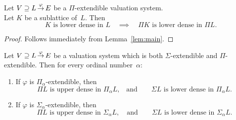 \documentclass[main.tex]{subfiles}
\begin{document}
\begin{cor}
\label{C:main-nice}
Let $V \supseteq L\,\smash{\stackrel{\varphi}{\rightarrow}}\,E$ be a $\Pi$-extendible valuation system.\\
Let $K$ be a sublattice of~$L$. Then
\begin{equation*}
\text{ $K$ is lower dense in~$L$}
\quad\implies\quad
\text{$\Pi K$ is lower dense in~$\Pi L$.}
\end{equation*}
\end{cor}
\begin{proof}
Follows immediately from Lemma~\ref{lem:main}.
\end{proof}
%
%
\begin{lem}
\label{L:fitting-dense}
Let $V \supseteq L\,\smash{\stackrel{\varphi}{\rightarrow}}\,E$ be a valuation system
which is both $\Sigma$-extendible
and $\Pi$-extendible.
Then for every ordinal number~$\alpha$:
\begin{enumerate}
\item 
\label{L:fitting-dense-1}
If $\varphi$ is $\Pi_\alpha$-extendible,
then 
\begin{equation*}
\text{$\Pi L$ is upper dense in $\Pi_\alpha L$,}
\quad\text{and}\qquad
\text{$\Sigma L$ is lower dense in $\Pi_\alpha L$.}
\end{equation*}

\item
\label{L:fitting-dense-2}
If $\varphi$ is $\Sigma_\alpha$-extendible,
then 
\begin{equation*}
\text{$\Pi L$ is upper dense in $\Sigma_\alpha L$},
\quad\text{and}\qquad
\text{$\Sigma L$ is lower dense in $\Sigma_\alpha L$.}
\end{equation*}
\end{enumerate}
\end{lem}
\end{document}

